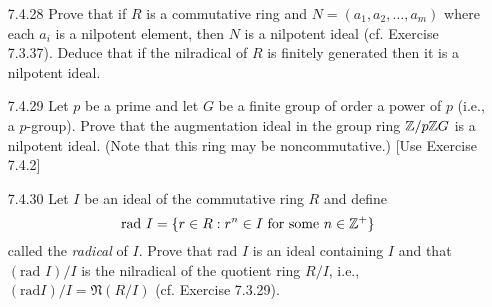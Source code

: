 \begin{enumerate}
      \textbf{Proof.} Suppose that $a$ is a nilpotent element of $R$. Let
      $b \in R$. Then Exercise 7.1.14(b) says that $a(-b)$ is nilpotent in $R$.
      Thus $1 + a(-b) = 1 - ab$ is a unit in $R$ by Exercise 7.1.14(c). \qed
   \item[7.4.28]  Prove that if $R$ is a commutative ring and
                  $N = (a_1, a_2, \ldots, a_m)$ where each $a_i$ is a nilpotent
                  element, then $N$ is a nilpotent ideal (cf. Exercise 7.3.37).
                  Deduce that if the nilradical of $R$ is finitely generated
                  then it is a nilpotent ideal.
   \item[7.4.29]  Let $p$ be a prime and let $G$ be a finite group of order a
                  power of $p$ (i.e., a $p$-group). Prove that the augmentation
                  ideal in the group ring $\mathbb{Z}/p\mathbb{Z} G$ is a nilpotent ideal. (Note
                  that this ring may be noncommutative.) [Use Exercise 7.4.2]
   \item[7.4.30]  Let $I$ be an ideal of the commutative ring $R$ and define
                  $$\text{rad }I = \{r \in R : r^n \in I
                    \text{ for some }n \in \mathbb{Z}^+\}$$
                  called the \textit{radical} of $I$. Prove that rad $I$ is an
                  ideal containing $I$ and that $(\text{rad }I)/I$ is the
                  nilradical of the quotient ring $R/I$, i.e.,
                  $(\text{rad} I)/I = \mathfrak{N}(R/I)$ (cf. Exercise 7.3.29).
                  

\end{enumerate}
